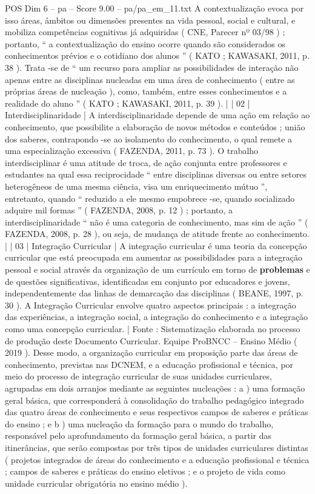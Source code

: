 \begin{textsample}{POS Dim 6 – pa – Score 9.00 – pa/pa\_em\_11.txt}
A contextualização evoca por isso áreas, âmbitos ou dimensões presentes na vida pessoal, social e cultural, e mobiliza competências cognitivas já adquiridas ( CNE, Parecer nº 03/98 ) ; portanto, “ a contextualização do ensino ocorre quando são considerados os conhecimentos prévios e o cotidiano dos alunos ” ( KATO ; KAWASAKI, 2011, p. 38 ).
Trata -se de “ um recurso para ampliar as possibilidades de interação não apenas entre as disciplinas nucleadas em uma área de conhecimento ( entre as próprias áreas de nucleação ), como, também, entre esses conhecimentos e a realidade do aluno ” ( KATO ; KAWASAKI, 2011, p. 39 ). | | 02 | Interdisciplinaridade | A interdisciplinaridade depende de uma ação em relação ao conhecimento, que possibilite a elaboração de novos métodos e conteúdos ; união dos saberes, contrapondo -se ao isolamento do conhecimento, o qual remete a uma especialização excessiva ( FAZENDA, 2011, p. 73 ).
O trabalho interdisciplinar é uma atitude de troca, de ação conjunta entre professores e estudantes na qual essa reciprocidade “ entre disciplinas diversas ou entre setores heterogêneos de uma mesma ciência, visa um enriquecimento mútuo ”, entretanto, quando “ reduzido a ele mesmo empobrece -se, quando socializado adquire mil formas ” ( FAZENDA, 2008, p. 12 ) ; portanto, a interdisciplinaridade “ não é uma categoria de conhecimento, mas sim de ação ” ( FAZENDA, 2008, p. 28 ), ou seja, de mudança de atitude frente ao conhecimento. | | 03 | Integração Curricular | A integração curricular é uma teoria da concepção curricular que está preocupada em aumentar as possibilidades para a integração pessoal e social através da organização de um currículo em torno de \textbf{problemas} e de questões significativas, identificadas em conjunto por educadores e jovens, independentemente das linhas de demarcação das disciplinas ( BEANE, 1997, p. 30 ).
A Integração Curricular envolve quatro aspectos principais : a integração das experiências, a integração social, a integração do conhecimento e a integração como uma concepção curricular. | Fonte : Sistematização elaborada no processo de produção deste Documento Curricular.
Equipe ProBNCC – Ensino Médio ( 2019 ).
Desse modo, a organização curricular em proposição parte das áreas de conhecimento, previstas nas DCNEM, e a educação profissional e técnica, por meio do processo de integração curricular de suas unidades curriculares, agrupadas em dois arranjos mediante as seguintes nucleações : a ) uma formação geral básica, que corresponderá à consolidação do trabalho pedagógico integrado das quatro áreas de conhecimento e seus respectivos campos de saberes e práticas do ensino ; e b ) uma nucleação da formação para o mundo do trabalho, responsável pelo aprofundamento da formação geral básica, a partir das itinerâncias, que serão compostas por três tipos de unidades curriculares distintas ( projetos integrados de áreas do conhecimento e a educação profissional e técnica ; campos de saberes e práticas do ensino eletivos ; e o projeto de vida como unidade curricular obrigatória no ensino médio ).

\end{textsample}
